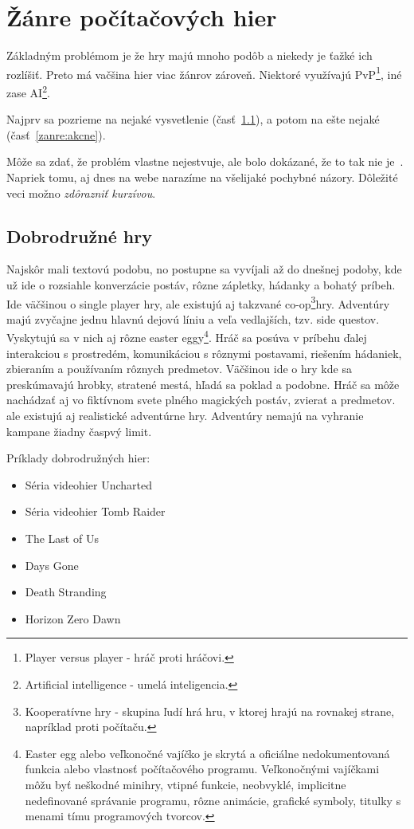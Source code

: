 \documentclass[10pt,twoside,slovak,a4paper]{coursepaper}
\begin{document}
\section{Žánre počítačových hier} \label{zanre}

Základným problémom je že hry majú mnoho podôb a niekedy je ťažké ich rozlíšiť. Preto má vačšina hier viac žánrov zároveň.  Niektoré využívajú PvP\footnote{Player versus player - hráč proti hráčovi.}, iné zase AI\footnote{Artificial intelligence - umelá inteligencia.}.

Najprv sa pozrieme na nejaké vysvetlenie (časť~\ref{zanre:adventure}), a potom na ešte nejaké (časť~\ref{zanre:akcne}).

Môže sa zdať, že problém vlastne nejestvuje\cite{Coplien:MPD}, ale bolo dokázané, že to tak nie je~\cite{Czarnecki:Staged, Czarnecki:Progress}. Napriek tomu, aj dnes na webe narazíme na všelijaké pochybné názory\cite{PLP-Framework}. Dôležité veci možno \emph{zdôrazniť kurzívou}.


\subsection{Dobrodružné hry} \label{zanre:adventure}

Najskôr mali textovú podobu, no postupne sa vyvíjali až do dnešnej podoby, kde už ide o rozsiahle konverzácie postáv, rôzne zápletky, hádanky a bohatý príbeh. Ide väčšinou o single player hry, ale existujú aj takzvané co-op\footnote{Kooperatívne hry - skupina ľudí hrá hru, v ktorej hrajú na rovnakej strane, napríklad proti počítaču.}hry. Adventúry majú zvyčajne jednu hlavnú dejovú líniu a veľa vedlajších, tzv. side questov. Vyskytujú sa v nich aj rôzne easter eggy\footnote{Easter egg alebo veľkonočné vajíčko je skrytá a oficiálne nedokumentovaná funkcia alebo vlastnosť počítačového programu. Veľkonočnými vajíčkami môžu byť neškodné minihry, vtipné funkcie, neobvyklé, implicitne nedefinované správanie programu, rôzne animácie, grafické symboly, titulky s menami tímu programových tvorcov.}. Hráč sa posúva v príbehu ďalej interakciou s prostredém, komunikáciou s rôznymi postavami, riešením hádaniek, zbieraním a používaním rôznych predmetov. Väčšinou ide o hry kde sa preskúmavajú hrobky, stratené mestá, hľadá sa poklad a podobne. Hráč sa môže nachádzať aj vo fiktívnom svete plného magických postáv, zvierat a predmetov. ale existujú aj realistické adventúrne hry. Adventúry nemajú na vyhranie kampane žiadny časpvý limit.

Príklady dobrodružných hier:
\begin{itemize}
\item Séria videohier Uncharted
\item Séria videohier Tomb Raider
\item The Last of Us
\item Days Gone
\item Death Stranding
\item Horizon Zero Dawn
\end{itemize}
\end{document}
